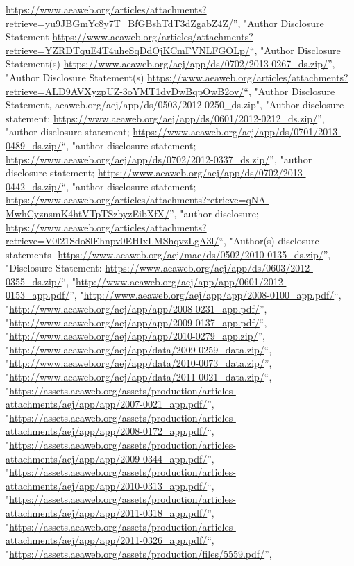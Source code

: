 \documentclass[]{article}
\begin{document}
\begin{itemize}
  \url{https://www.aeaweb.org/articles/attachments?retrieve=yu9JBGmYc8y7T_BfGBshTdT3dZgabZ4Z/}'',
  "Author Disclosure Statement
  \url{https://www.aeaweb.org/articles/attachments?retrieve=YZRDTquE4T4uheSqDdOjKCmFVNLFGOLp/}``,
  "Author Disclosure Statement(s)
  \url{https://www.aeaweb.org/aej/app/ds/0702/2013-0267_ds.zip/}'',
  "Author Disclosure Statement(s)
  \url{https://www.aeaweb.org/articles/attachments?retrieve=ALD9AVXyzpUZ-3oYMT1dvDwBqpOwB2ov/}``,
  "Author Disclosure Statement,
  aeaweb.org/aej/app/ds/0503/2012-0250\_ds.zip", "Author disclosure
  statement:
  \url{https://www.aeaweb.org/aej/app/ds/0601/2012-0212_ds.zip/}'',
  "author disclosure statement;
  \url{https://www.aeaweb.org/aej/app/ds/0701/2013-0489_ds.zip/}``,
  "author disclosure statement;
  \url{https://www.aeaweb.org/aej/app/ds/0702/2012-0337_ds.zip/}'',
  "author disclosure statement;
  \url{https://www.aeaweb.org/aej/app/ds/0702/2013-0442_ds.zip/}``,
  "author disclosure statement;
  \url{https://www.aeaweb.org/articles/attachments?retrieve=qNA-MwhCyznsmK4htVTpTSzbyzEibXfX/}'',
  "author disclosure;
  \url{https://www.aeaweb.org/articles/attachments?retrieve=V0l21Sdo8lEhnpv0EHIxLMShqvzLgA3l/}``,
  "Author(s) disclosure statements-
  \url{https://www.aeaweb.org/aej/mac/ds/0502/2010-0135_ds.zip/}'',
  "Disclosure Statement:
  \url{https://www.aeaweb.org/aej/app/ds/0603/2012-0355_ds.zip/}``,
  "\url{http://www.aeaweb.org/aej/app/app/0601/2012-0153_app.pdf/}'',
  "\url{http://www.aeaweb.org/aej/app/app/2008-0100_app.pdf/}``,
  "\url{http://www.aeaweb.org/aej/app/app/2008-0231_app.pdf/}'',
  "\url{http://www.aeaweb.org/aej/app/app/2009-0137_app.pdf/}``,
  "\url{http://www.aeaweb.org/aej/app/app/2010-0279_app.zip/}'',
  "\url{http://www.aeaweb.org/aej/app/data/2009-0259_data.zip/}``,
  "\url{http://www.aeaweb.org/aej/app/data/2010-0073_data.zip/}'',
  "\url{http://www.aeaweb.org/aej/app/data/2011-0021_data.zip/}``,
  "\url{https://assets.aeaweb.org/assets/production/articles-attachments/aej/app/app/2007-0021_app.pdf/}'',
  "\url{https://assets.aeaweb.org/assets/production/articles-attachments/aej/app/app/2008-0172_app.pdf/}``,
  "\url{https://assets.aeaweb.org/assets/production/articles-attachments/aej/app/app/2009-0344_app.pdf/}'',
  "\url{https://assets.aeaweb.org/assets/production/articles-attachments/aej/app/app/2010-0313_app.pdf/}``,
  "\url{https://assets.aeaweb.org/assets/production/articles-attachments/aej/app/app/2011-0318_app.pdf/}'',
  "\url{https://assets.aeaweb.org/assets/production/articles-attachments/aej/app/app/2011-0326_app.pdf/}``,
  "\url{https://assets.aeaweb.org/assets/production/files/5559.pdf/}'',

\end{itemize}
\end{document}
